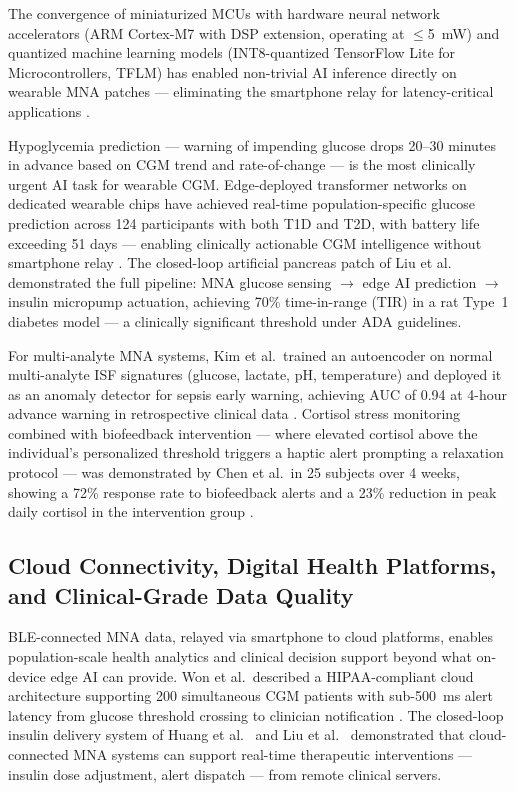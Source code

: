 \documentclass[review,1p]{elsarticle}
\begin{document}
The convergence of miniaturized MCUs with hardware neural network accelerators (ARM Cortex-M7 with DSP extension, operating at $\leq$5~mW) and quantized machine learning models (INT8-quantized TensorFlow Lite for Microcontrollers, TFLM) has enabled non-trivial AI inference directly on wearable MNA patches — eliminating the smartphone relay for latency-critical applications \cite{Fan2026EdgeAI}.

Hypoglycemia prediction — warning of impending glucose drops 20--30 minutes in advance based on CGM trend and rate-of-change — is the most clinically urgent AI task for wearable CGM. Edge-deployed transformer networks on dedicated wearable chips have achieved real-time population-specific glucose prediction across 124 participants with both T1D and T2D, with battery life exceeding 51 days — enabling clinically actionable CGM intelligence without smartphone relay \cite{Zhu2024EdgeGlucose}. The closed-loop artificial pancreas patch of Liu et al.\ \cite{Liu2025ClosedLoop} demonstrated the full pipeline: MNA glucose sensing $\to$ edge AI prediction $\to$ insulin micropump actuation, achieving 70\% time-in-range (TIR) in a rat Type~1 diabetes model — a clinically significant threshold under ADA guidelines.

For multi-analyte MNA systems, Kim et al.\ trained an autoencoder on normal multi-analyte ISF signatures (glucose, lactate, pH, temperature) and deployed it as an anomaly detector for sepsis early warning, achieving AUC of 0.94 at 4-hour advance warning in retrospective clinical data \cite{Kim2023Anomaly}. Cortisol stress monitoring combined with biofeedback intervention — where elevated cortisol above the individual's personalized threshold triggers a haptic alert prompting a relaxation protocol — was demonstrated by Chen et al.\ in 25 subjects over 4 weeks, showing a 72\% response rate to biofeedback alerts and a 23\% reduction in peak daily cortisol in the intervention group \cite{Chen2024Cortisol}.

\subsection{Cloud Connectivity, Digital Health Platforms, and Clinical-Grade Data Quality}
\label{subsec:cloud}

BLE-connected MNA data, relayed via smartphone to cloud platforms, enables population-scale health analytics and clinical decision support beyond what on-device edge AI can provide. Won et al.\ described a HIPAA-compliant cloud architecture supporting 200 simultaneous CGM patients with sub-500~ms alert latency from glucose threshold crossing to clinician notification \cite{Won2023Cloud}. The closed-loop insulin delivery system of Huang et al.\ \cite{Huang2024Theranostics} and Liu et al.\ \cite{Liu2025ClosedLoop} demonstrated that cloud-connected MNA systems can support real-time therapeutic interventions — insulin dose adjustment, alert dispatch — from remote clinical servers.
\end{document}
